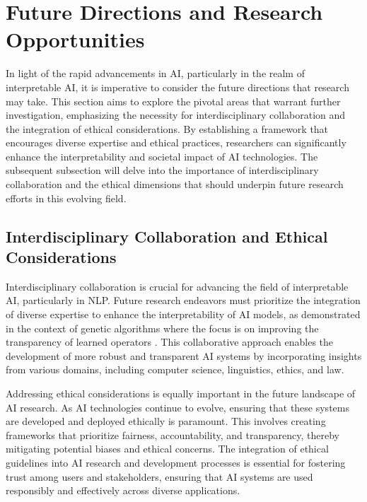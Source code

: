 \section{Future Directions and Research Opportunities} \label{sec:Future Directions and Research Opportunities}

In light of the rapid advancements in AI, particularly in the realm of interpretable AI, it is imperative to consider the future directions that research may take. This section aims to explore the pivotal areas that warrant further investigation, emphasizing the necessity for interdisciplinary collaboration and the integration of ethical considerations. By establishing a framework that encourages diverse expertise and ethical practices, researchers can significantly enhance the interpretability and societal impact of AI technologies. The subsequent subsection will delve into the importance of interdisciplinary collaboration and the ethical dimensions that should underpin future research efforts in this evolving field.





\subsection{Interdisciplinary Collaboration and Ethical Considerations} \label{subsec:Interdisciplinary Collaboration and Ethical Considerations}



Interdisciplinary collaboration is crucial for advancing the field of interpretable AI, particularly in NLP. Future research endeavors must prioritize the integration of diverse expertise to enhance the interpretability of AI models, as demonstrated in the context of genetic algorithms where the focus is on improving the transparency of learned operators \cite{lange2023discoveringattentionbasedgeneticalgorithms}. This collaborative approach enables the development of more robust and transparent AI systems by incorporating insights from various domains, including computer science, linguistics, ethics, and law.



Addressing ethical considerations is equally important in the future landscape of AI research. As AI technologies continue to evolve, ensuring that these systems are developed and deployed ethically is paramount. This involves creating frameworks that prioritize fairness, accountability, and transparency, thereby mitigating potential biases and ethical concerns. The integration of ethical guidelines into AI research and development processes is essential for fostering trust among users and stakeholders, ensuring that AI systems are used responsibly and effectively across diverse applications.



